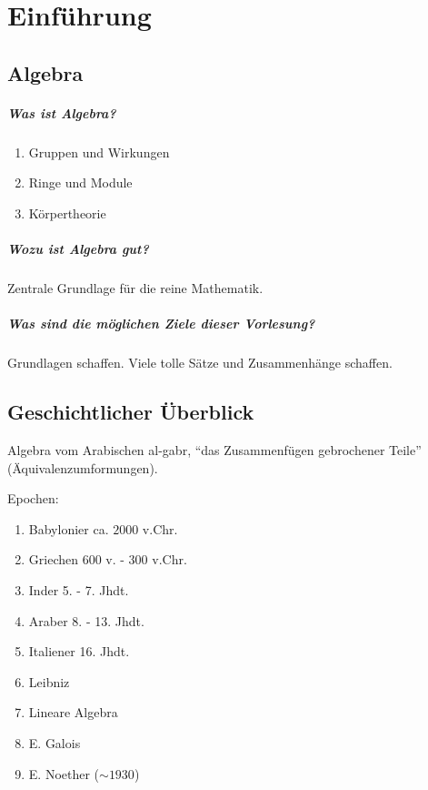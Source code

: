 \graphicspath{{Images/}}

\chapter{Einführung}
\section{Algebra}
\paragraph{Was ist Algebra?}
\begin{enumerate}
	\item Gruppen und Wirkungen
	\item Ringe und Module
	\item Körpertheorie
\end{enumerate}
\paragraph{Wozu ist Algebra gut?}
Zentrale Grundlage für die reine Mathematik.

\paragraph{Was sind die möglichen Ziele dieser Vorlesung?}
Grundlagen schaffen. Viele tolle Sätze und Zusammenhänge schaffen.

\section{Geschichtlicher Überblick}
Algebra vom Arabischen al-gabr, \enquote{das Zusammenfügen gebrochener Teile} (Äquivalenzumformungen).

Epochen:
\begin{enumerate}
	\item Babylonier ca. $2000$ v.Chr.
	\item Griechen $600$ v. - $300$ v.Chr.
	\item Inder 5. - 7. Jhdt.
	\item Araber 8. - 13. Jhdt.
	\item Italiener 16. Jhdt.
	\item Leibniz
	\item Lineare Algebra 
	\item E. Galois
	\item E. Noether ($\sim 1930$)
\end{enumerate}

